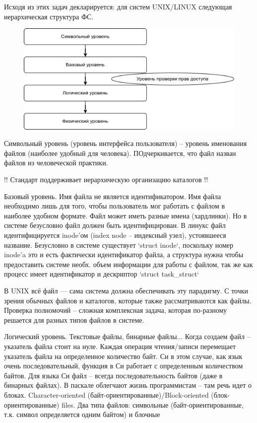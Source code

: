 \documentclass[a4paper,12pt]{article}
\begin{document}
Исходя из этих задач декларируется: для систем UNIX/LINUX следующая иерархическая структура ФС.

\begin{figure}[ht]
	\centering
	\includegraphics[width=\linewidth]{filelevels}
\end{figure}

Символьный уровень (уровень интерфейса пользователя) -- уровень именования файлов (наиболее удобный для человека). ПОдчеркивается, что файл назван файлов из человеческой практики.

!! Стандарт поддерживает иерархическую организацию каталогов !!

Базовый уровень. Имя файла не является идентификатором. Имя файла необходимо лишь для того, чтобы пользователь мог работать с файлом в наиболее удобном формате. Файл может иметь разные имена (хардлинки). Но в системе безусловно файл должен быть идентифицирован. В линукс файл идентифицируется inode'ом (index node -- индексный узел), устоявшееся название. Безусловно в системе существует `struct inode`, поскольку номер inode'a это и есть фактически идентификатор файла, а структура нужна чтобы предоставить системе необх. объем информации для работы с файлом, так же как процесс имеет идентификатор и дескриптор `struct task\_struct`

В UNIX всё файл --- сама система должна обеспечивать эту парадигму. С точки зрения обычных файлов и каталогов, которые также рассматриваются как файлы. Проверка полномочий -- сложная комплексная задача, которая по-разному решается для разных типов файлов в системе.

Логический уровень. Текстовые файлы, бинарные файлы... Когда создаем файл -- указатель файла стоит на нуле. Каждая операция чтения/записи перемещает указатель файла на определенное количество байт. Си в этом случае, как язык очень последовательный, функция в Си работает с определенным количеством байтов. Для языка Си файл -- всегда последовательность байтов (даже в бинарных файлах). В паскале облегчают жизнь программистам -- там речь идет о блоках. Character-oriented (байт-ориентированные)/Block-oriented (блок-ориентированные) files. Два типа файлов: символьные (байт-ориентированные, т.к. символ определяется одним байтом) и блочные
\end{document}
